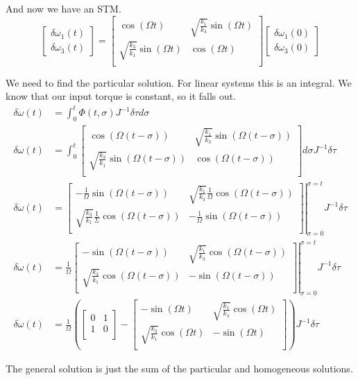 \documentclass[]{article}
\begin{document}
And now we have an STM.
\begin{equation}
	\begin{bmatrix}
	\delta \omega_1 (t) \\
	\delta \omega_3 (t)
	\end{bmatrix} = \begin{bmatrix}
	\cos(\Omega t) & \sqrt{\frac{k_1}{k_3}} \sin(\Omega t) \\
	\sqrt{\frac{k_3}{k_1}} \sin(\Omega t) & \cos(\Omega t) \\
	\end{bmatrix} \begin{bmatrix}
	\delta \omega_1 (0) \\
	\delta \omega_3 (0)
	\end{bmatrix}
\end{equation}

We need to find the particular solution. For linear systems this is an integral. We know that our input torque is constant, so it falls out.
\begin{align}
	\delta \omega (t) & = \int_{0}^{t} \Phi(t,\sigma) J^{-1} \delta \tau d \sigma \\
	\delta \omega (t) & = \int_{0}^{t} \begin{bmatrix}
	\cos(\Omega (t - \sigma)) & \sqrt{\frac{k_1}{k_3}} \sin(\Omega (t - \sigma)) \\
	\sqrt{\frac{k_3}{k_1}} \sin(\Omega (t - \sigma)) & \cos(\Omega (t - \sigma)) \\
	\end{bmatrix} d \sigma J^{-1} \delta \tau \\
	\delta \omega (t) & = \left. \begin{bmatrix}
	-\frac{1}{\Omega}\sin(\Omega (t - \sigma)) & \sqrt{\frac{k_1}{k_3}} \frac{1}{\Omega} \cos(\Omega (t - \sigma)) \\
	\sqrt{\frac{k_3}{k_1}} \frac{1}{\Sigma} \cos(\Omega (t - \sigma)) & -\frac{1}{\Omega} \sin(\Omega (t - \sigma)) \\
	\end{bmatrix} \right|_{\sigma = 0}^{\sigma = t} J^{-1} \delta \tau \\
	\delta \omega (t) & = \frac{1}{\Omega} \left. \begin{bmatrix}
	-\sin(\Omega (t - \sigma)) & \sqrt{\frac{k_1}{k_3}} \cos(\Omega (t - \sigma)) \\
	\sqrt{\frac{k_3}{k_1}} \cos(\Omega (t - \sigma)) & - \sin(\Omega (t - \sigma)) \\
	\end{bmatrix} \right|_{\sigma = 0}^{\sigma = t} J^{-1} \delta \tau \\
	\delta \omega (t) & = \frac{1}{\Omega} \left( \begin{bmatrix}
	0 & 1 \\
	1 & 0 \\
	\end{bmatrix} - \begin{bmatrix}
	-\sin(\Omega t) & \sqrt{\frac{k_1}{k_3}} \cos(\Omega t) \\
	\sqrt{\frac{k_3}{k_1}} \cos(\Omega t) & - \sin(\Omega t) \\
	\end{bmatrix} \right) J^{-1} \delta \tau
\end{align}

The general solution is just the sum of the particular and homogeneous solutions.
\end{document}

